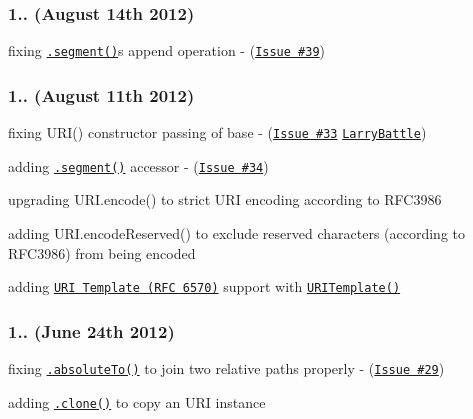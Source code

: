 \subsubsection*{1.. (August 14th 2012)}


\begin{DoxyItemize}
\item fixing \href{http://medialize.github.io/URI.js/docs.html#accessors-segment}{\tt {\ttfamily .segment()}}\textquotesingle{}s append operation -\/ (\href{https://github.com/medialize/URI.js/issues/39}{\tt Issue \#39})
\end{DoxyItemize}

\subsubsection*{1.. (August 11th 2012)}


\begin{DoxyItemize}
\item fixing U\+R\+I() constructor passing of {\ttfamily base} -\/ (\href{https://github.com/medialize/URI.js/issues/33}{\tt Issue \#33} \href{https://github.com/LarryBattle}{\tt Larry\+Battle})
\item adding \href{http://medialize.github.io/URI.js/docs.html#accessors-segment}{\tt {\ttfamily .segment()}} accessor -\/ (\href{https://github.com/medialize/URI.js/issues/34}{\tt Issue \#34})
\item upgrading {\ttfamily U\+R\+I.\+encode()} to strict U\+RI encoding according to R\+F\+C3986
\item adding {\ttfamily U\+R\+I.\+encode\+Reserved()} to exclude reserved characters (according to R\+F\+C3986) from being encoded
\item adding \href{http://tools.ietf.org/html/rfc6570}{\tt U\+RI Template (R\+FC 6570)} support with \href{http://medialize.github.io/URI.js/uri-template.html}{\tt {\ttfamily U\+R\+I\+Template()}}
\end{DoxyItemize}

\subsubsection*{1.. (June 24th 2012)}


\begin{DoxyItemize}
\item fixing \href{http://medialize.github.io/URI.js/docs.html#absoluteto}{\tt {\ttfamily .absolute\+To()}} to join two relative paths properly -\/ (\href{https://github.com/medialize/URI.js/issues/29}{\tt Issue \#29})
\item adding \href{http://medialize.github.io/URI.js/docs.html#clone}{\tt {\ttfamily .clone()}} to copy an U\+RI instance
\end{DoxyItemize}

